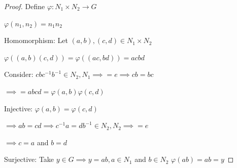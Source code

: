 \begin{proof}
    Define $\varphi:N_1\times N_2 \rightarrow G$

    $\varphi(n_1,n_2)=n_1n_2$

    Homomorphism: Let $(a,b),(c,d)\in N_1\times N_2$

    $\varphi((a,b)(c,d))=\varphi((ac,bd))=acbd$

    Consider: $cbc^{-1}b^{-1}\in N_2, N_1 \implies =e \implies cb=bc$

    $\implies =abcd=\varphi(a,b)\varphi(c,d)$

    Injective: $\varphi(a,b)=\varphi(c,d)$

    $\implies ab=cd \implies c^{-1}a=db^{-1}\in N_2,N_2 \implies = e$

    $\implies c=a$ and $b=d$

    Surjective: Take $y\in G \implies y=ab, a\in N_1$ and $b\in N_2$ $\varphi(ab)=ab=y$
\end{proof}